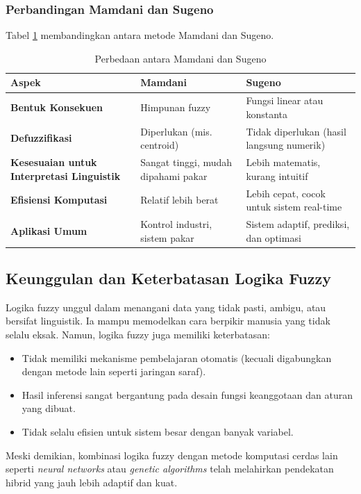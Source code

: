 \documentclass[12pt,a4paper]{article}
\theoremstyle{remark}
\begin{document}
\subsubsection{Perbandingan Mamdani dan Sugeno}
Tabel \ref{tab:perbedaan_masu} membandingkan antara metode Mamdani dan Sugeno.
\begin{table}[H]
    \centering
    \caption{Perbedaan antara Mamdani dan Sugeno}
    \label{tab:perbedaan_masu}

    \begin{tabular}{|p{3cm}|p{5cm}|p{5cm}|}
        \hline
        \textbf{Aspek}                                    & \textbf{Mamdani}                    & \textbf{Sugeno}                           \\ \hline
        \textbf{Bentuk Konsekuen}                         & Himpunan fuzzy                      & Fungsi linear atau konstanta              \\ \hline
        \textbf{Defuzzifikasi}                            & Diperlukan (mis. centroid)          & Tidak diperlukan (hasil langsung numerik) \\ \hline
        \textbf{Kesesuaian untuk Interpretasi Linguistik} & Sangat tinggi, mudah dipahami pakar & Lebih matematis, kurang intuitif          \\ \hline
        \textbf{Efisiensi Komputasi}                      & Relatif lebih berat                 & Lebih cepat, cocok untuk sistem real-time \\ \hline
        \textbf{Aplikasi Umum}                            & Kontrol industri, sistem pakar      & Sistem adaptif, prediksi, dan optimasi    \\ \hline
    \end{tabular}

\end{table}


\subsection{Keunggulan dan Keterbatasan Logika Fuzzy}
Logika fuzzy unggul dalam menangani data yang tidak pasti, ambigu, atau bersifat linguistik. Ia mampu memodelkan cara berpikir manusia yang tidak selalu eksak.
Namun, logika fuzzy juga memiliki keterbatasan:
\begin{itemize}
    \item Tidak memiliki mekanisme pembelajaran otomatis (kecuali digabungkan dengan metode lain seperti jaringan saraf).
    \item Hasil inferensi sangat bergantung pada desain fungsi keanggotaan dan aturan yang dibuat.
    \item Tidak selalu efisien untuk sistem besar dengan banyak variabel.
\end{itemize}
Meski demikian, kombinasi logika fuzzy dengan metode komputasi cerdas lain seperti \textit{neural networks} atau \textit{genetic algorithms} telah melahirkan pendekatan hibrid yang jauh lebih adaptif dan kuat.
\end{document}

